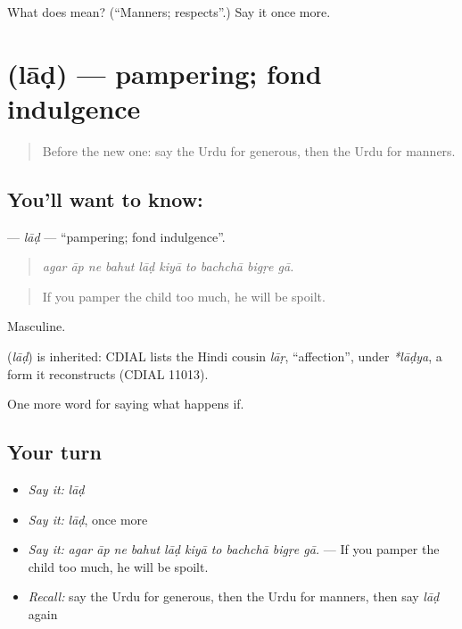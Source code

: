 \begin{tcolorbox}[breakable,colback=teal!4,colframe=teal!35!black,title={Before you move on}]
What does  mean? (\textquotedblleft{}Manners; respects\textquotedblright{}.) Say it once more.
\end{tcolorbox}
\section[\texorpdfstring{\ur{لاڈ} (lāḍ)}{لاڈ (lāḍ)}]{ (lāḍ) — pampering; fond indulgence}

\label{lesson:UR-C384-lad}



\begin{quote}
Before the new one: say the Urdu for generous, then the Urdu for manners.
\end{quote}

\subsection*{You'll want to know: }
\textbf{} — \emph{lāḍ} — \textquotedblleft{}pampering; fond indulgence\textquotedblright{}.

\begin{quote}
         
\end{quote}

\begin{quote}
\emph{agar āp ne bahut lāḍ kiyā to bachchā bigṛe gā.}
\end{quote}

\begin{quote}
If you pamper the child too much, he will be spoilt.
\end{quote}

Masculine.

\begin{cousinweb}
\textbf{} (\emph{lāḍ}) is inherited: CDIAL lists the Hindi cousin \emph{lāṛ}, \textquotedblleft{}affection\textquotedblright{}, under \emph{*lāḍya}, a form it reconstructs (CDIAL 11013).
\end{cousinweb}

\begin{grammarlens}[title={What you've built}]
One more word for saying what happens if.
\end{grammarlens}

\subsection*{Your turn}
\begin{itemize}
\raggedright
  \item \emph{Say it:} \emph{lāḍ}
  \item \emph{Say it:} \emph{lāḍ}, once more
  \item \emph{Say it:} \emph{agar āp ne bahut lāḍ kiyā to bachchā bigṛe gā.} — If you pamper the child too much, he will be spoilt.
  \item \emph{Recall:} say the Urdu for generous, then the Urdu for manners, then say \emph{lāḍ} again
\end{itemize}

